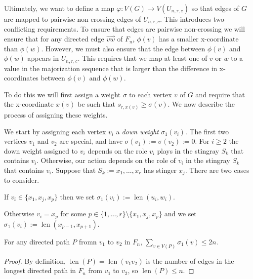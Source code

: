 \documentclass{patmorin}
\newcommand{\defin}[1]{\emph{\color{brightmaroon}#1}}
\DeclareMathOperator{\len}{len}
\begin{document}
Ultimately, we want to define a map $\varphi:V(G)\to V(U_{n,r,c})$ so that edges of $G$ are mapped to pairwise non-crossing edges of $U_{n,r,c}$.  This introduces two conflicting requirements. To ensure that edges are pairwise non-crossing we will ensure that for any directed edge $\overrightarrow{vw}$ of $F_n$, $\phi(v)$ has a smaller x-coordinate than $\phi(w)$.   However, we must also ensure that the edge between $\phi(v)$ and $\phi(w)$ appears in $U_{n,r,c}$. This requires that we map at least one of $v$ or $w$ to a value in the majorization sequence that is larger than the difference in x-coordinates between $\phi(v)$ and $\phi(w)$.

To do this we will first assign a weight $\sigma$ to each vertex $v$ of $G$ and require that the x-coordinate $x(v)$ be such that $s_{r,x(v)} \ge \sigma(v)$.  We now describe the process of assigning these weights.

We start by assigning each vertex $v_i$ a \defin{down weight} $\sigma_1(v_i)$. The first two vertices $v_1$ and $v_2$ are special, and have $\sigma(v_1):=\sigma(v_2):=0$.  For $i\ge 2$ the down weight assigned to $v_i$ depends on the role $v_i$ plays in the stingray $S_k$ that contains $v_i$.  Otherwise, our action depends on the role of $v_i$ in the stingray $S_k$ that contains $v_i$.  Suppose that $S_k:=x_1,\ldots,x_r$ has stinger $x_j$.  There are two cases to consider.
\begin{compactenum}
  \item If $v_i\in\{x_1,x_j,x_p\}$ then we set $\sigma_1(v_i):=\len(u_i,w_i)$.

  \item Otherwise $v_i=x_p$ for some $p\in\{1,\ldots,r\}\setminus\{x_1,x_j,x_p\}$ and we set $\sigma_1(v_i):=\len(x_{p-1},x_{p+1})$.
\end{compactenum}


\begin{lem}
  For any directed path $P$ fromn $v_1$ to $v_2$ in $F_n$, $\sum_{v\in V(P)} \sigma_1(v) \le 2n$.
\end{lem}

\begin{proof}
  By definition, $\len(P)=\len(v_1v_2)$ is the number of edges in the longest directed path in $F_n$ from $v_1$ to $v_2$, so $\len(P)\le n$.
\end{proof}
\end{document}
